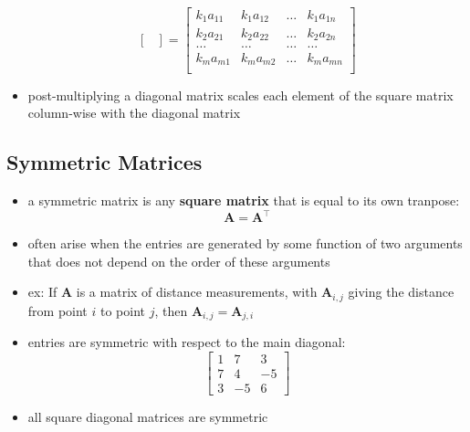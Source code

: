 \documentclass[11pt,twocolumn]{report}
\begin{document}
\begin{itemize}
\begin{equation*}
\begin{bmatrix}
        \end{bmatrix}
        =
        \begin{bmatrix}
          k_1a_{11} & k_1a_{12} & \hdots & k_1a_{1n}\\
          k_2a_{21} & k_2a_{22} & \hdots & k_2a_{2n}\\
          \hdots & \hdots & \hdots & \hdots\\
          k_ma_{m1} & k_ma_{m2} & \hdots & k_ma_{mn}\\
        \end{bmatrix}
      \end{equation*}
  \item post-multiplying a diagonal matrix scales each element of the square
    matrix column-wise with the diagonal matrix
\end{itemize}

\subsection{Symmetric Matrices}
\begin{itemize}
  \item a symmetric matrix is any \textbf{square matrix} that is equal to its
    own tranpose:
    \begin{equation}
      \bm{A} = \bm{A}^\intercal
    \end{equation}
  \item often arise when the entries are generated by some function of two
    arguments that does not depend on the order of these arguments
  \item ex: If $\bm{A}$ is a matrix of distance measurements, with $\bm{A}_{i,
      j}$ giving the distance from point $i$ to point $j$, then $\bm{A}_{i,j} =
    \bm{A}_{j, i}$
  \item entries are symmetric with respect to the main diagonal:
    \begin{equation*}
      \begin{bmatrix}
        1 & 7 & 3 \\
        7 & 4 & -5 \\
        3 & -5 & 6
      \end{bmatrix}
    \end{equation*}
  \item all square diagonal matrices are symmetric
\end{itemize}
\end{document}
